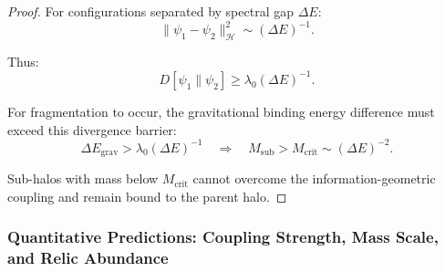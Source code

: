 \begin{lemma}
\begin{proof}
For configurations separated by spectral gap $\Delta E$:
\begin{equation}
\|\psi_1 - \psi_2\|_{\mathcal{H}}^2 \sim (\Delta E)^{-1}.
\end{equation}

Thus:
\begin{equation}
D[\psi_1 \| \psi_2] \geq \lambda_0 (\Delta E)^{-1}.
\end{equation}

For fragmentation to occur, the gravitational binding energy difference must exceed this divergence barrier:
\begin{equation}
\Delta E_{\text{grav}} > \lambda_0 (\Delta E)^{-1} \quad \Rightarrow \quad M_{\text{sub}} > M_{\text{crit}} \sim (\Delta E)^{-2}.
\end{equation}

Sub-halos with mass below $M_{\text{crit}}$ cannot overcome the information-geometric coupling and remain bound to the parent halo.

\end{proof}

\end{lemma}

\subsubsection{Quantitative Predictions: Coupling Strength, Mass Scale, and Relic Abundance}
\label{subsubsec:quantitativeDMPredictions}

